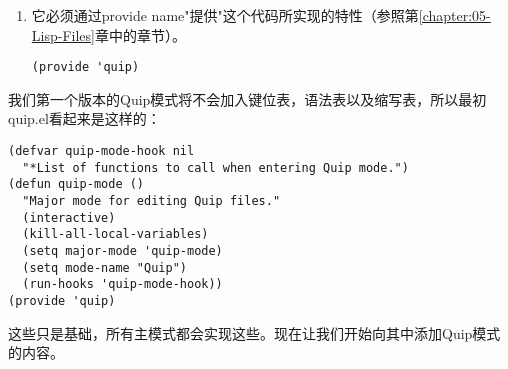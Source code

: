 \begin{enumerate}
  \begin{enumerate}
    \item 它必须调用 \texttt{kill-all-lcoal-variables} ，这会移除掉所有 \texttt{buffer-local} 的变量。这会高效地关闭所有处于激活状态的主模式和子模式。
\begin{verbatim}
(kill-all-local-variables)
\end{verbatim}
    \item 它必须将变量 \texttt{major-mode} 设置为 \texttt{name-mode} 。
\begin{verbatim}
(seqt major-mode 'quip-mode)
\end{verbatim}
    \item 它必须将变量 \texttt{mode-name} 设置为一个用来描述这个模式的缩写字符串，这将会出现在buffer的模式栏里。
\begin{verbatim}
(setq mode-name "Quip")
\end{verbatim}
    \item 如果键位表存在的话，它必须对其安装，这是通过将 \texttt{name-mode-map} 传递给 \texttt{use-local-map} 完成的。
    \item 它必须通过向 \texttt{run-hooks} 传递 \texttt{name-mode-hook} 执行用户的钩子函数。
\begin{verbatim}
(run-hooks 'quip-mode-hook)
\end{verbatim}
  \end{enumerate}
  \item 它必须通过provide name"提供"这个代码所实现的特性（参照第\ref{chapter:05-Lisp-Files}章中的章节）。
\begin{verbatim}
(provide 'quip)
\end{verbatim}
\end{enumerate}

我们第一个版本的Quip模式将不会加入键位表，语法表以及缩写表，所以最初quip.el看起来是这样的：

\begin{verbatim}
(defvar quip-mode-hook nil
  "*List of functions to call when entering Quip mode.")
(defun quip-mode ()
  "Major mode for editing Quip files."
  (interactive)
  (kill-all-local-variables)
  (setq major-mode 'quip-mode)
  (setq mode-name "Quip")
  (run-hooks 'quip-mode-hook))
(provide 'quip)
\end{verbatim}

这些只是基础，所有主模式都会实现这些。现在让我们开始向其中添加Quip模式的内容。

